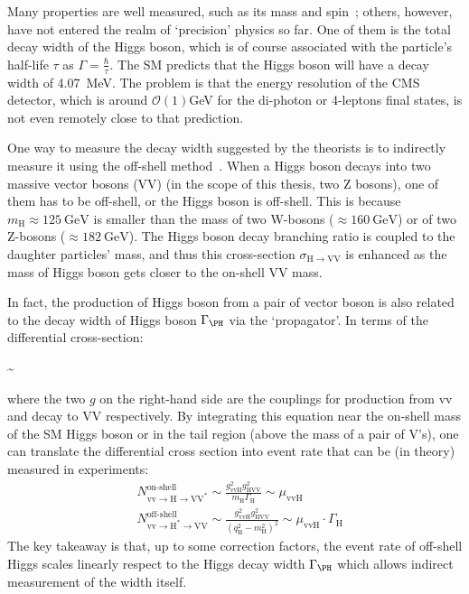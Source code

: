 Many properties are well measured, such as its mass and spin~\cite{cms_higgs}; others, however,
have not entered the realm of `precision' physics so far. One of them is the total decay width of
the Higgs boson, which is of course associated with the particle's half-life $\tau$ as $\Gamma=\frac{\hbar}{\tau}$.
The SM predicts
that the Higgs boson will have a decay width of \SI{4.07}{\mega\electronvolt}. The problem is
that the energy resolution of the CMS detector, which is around $\mathcal{O}(1) $\si{\giga\electronvolt}
for the di-photon or 4-leptons final states, is not even remotely close to that prediction.

One way to measure the decay width suggested by the theorists is to indirectly measure it using the
off-shell method~\cite{offshell_theory1, offshell_theory2}. When a Higgs boson decays into two massive
vector bosons (VV) (in the scope of this thesis, two Z bosons),
one of them has to be off-shell, or the Higgs boson is off-shell. This is because
$m_\text{H}\approx\SI{125}{\giga\electronvolt}$ is smaller than the 
mass of two W-bosons ($\approx\SI{160}{\giga\electronvolt}$) 
or of two Z-bosons ($\approx\SI{182}{\giga\electronvolt}$). The Higgs boson decay branching ratio
is coupled to the daughter particles' mass, and thus this cross-section
$\sigma_{\mathrm{H}\rightarrow\mathrm{VV}}$ is enhanced as the mass of Higgs boson gets closer to 
the on-shell VV mass.  

In fact, the production of Higgs boson from a pair of vector boson is also related to the
decay width of Higgs boson $\Gamma_\text{\PH}$ via the `propagator'\cite{offshell_poc}. In terms of the
differential cross-section:

\be
\label{eqn:diff_xsec}
\sim 
{}
\ee

where the two $g$ on the right-hand side are the couplings for production from vv and decay
to VV respectively. By integrating this equation near the on-shell mass of the SM Higgs boson 
or in the tail region (above the mass of a pair of V's), one can translate the differential cross section
into event rate that can be (in theory) measured in experiments:
\begin{equation}
\begin{split}
&N_{\mathrm{vv} \rightarrow \mathrm{H} \rightarrow \mathrm{VV}^{*}}^{\text{on-shell}} \sim \frac{g_{\mathrm{vvH}}^{2} g_{\mathrm{HVV}}^{2}}{m_{\mathrm{H}} \Gamma_{\mathrm{H}}} \sim \mu_{\mathrm{vvH}}
\\
&N_{\mathrm{vv} \rightarrow \mathrm{H}^{*} \rightarrow \mathrm{VV}}^{\text{off-shell}} \sim \frac{g_{\mathrm{vvH}}^{2} g_{\mathrm{HVV}}^{2}}{\left(q_{\mathrm{H}}^{2}-m_{\mathrm{H}}^{2}\right)^{2}} \sim \mu_{\mathrm{vvH}} \cdot \Gamma_{\mathrm{H}}
\end{split}
\end{equation}
The key takeaway is that, up to some correction factors, the event rate of off-shell Higgs scales
linearly respect to the Higgs decay width $\Gamma_\text{\PH}$ which allows indirect
measurement of the width itself.

